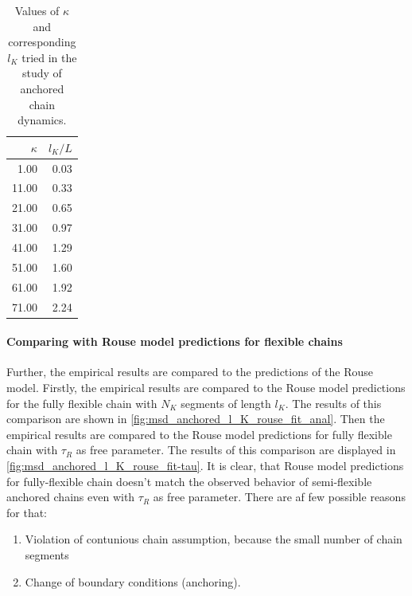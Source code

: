 \documentclass[
    paper=A4,pagesize=automedia,fontsize=12pt,
    BCOR=15mm,DIV=22,
    twoside,headinclude,footinclude=false,
    fleqn,             %
    bibliography=totocnumbered,          %
    listof=totoc,                %
    listof=flat,                 %
    cleardoublepage=empty      %
    numbers=endperiod
]{scrartcl}
\begin{document}
\begin{table}
    
    \centering
\begin{tabular}{rr}
    \toprule
    $\kappa$ & $l_K / L$ \\
    \midrule
    1.00 & 0.03 \\
    11.00 & 0.33 \\
    21.00 & 0.65 \\
    31.00 & 0.97 \\
    41.00 & 1.29 \\
    51.00 & 1.60 \\
    61.00 & 1.92 \\
    71.00 & 2.24 \\
    \bottomrule
    \end{tabular}
    \caption{
        Values of $\kappa$ and corresponding $l_K$ tried in the study
        of anchored chain dynamics.
        }
    \label{table:kappa_values}
\end{table}

\FloatBarrier

\paragraph{Comparing with Rouse model predictions for flexible chains}

Further, the empirical results are compared to the predictions of the Rouse model.
Firstly, the empirical results are compared to the Rouse model predictions for the fully
flexible chain with $N_K$ segments of length $l_K$. The results of this comparison are shown
in \autoref{fig:msd_anchored_l_K_rouse_fit_anal}. Then the empirical 
results are compared to the Rouse model predictions for fully flexible chain 
with $\tau_R$ as free parameter. The results of this comparison
are displayed in \autoref{fig:msd_anchored_l_K_rouse_fit-tau}. It is clear, 
that Rouse model predictions for fully-flexible chain doesn't match
the observed behavior of semi-flexible anchored chains even with $\tau_R$ as 
free parameter. There are af few possible reasons for that: 
\begin{enumerate}
    \item Violation of contunious chain assumption, because the small number of 
    chain segments
    \item Change of boundary conditions (anchoring).
\end{enumerate}
\end{document}
